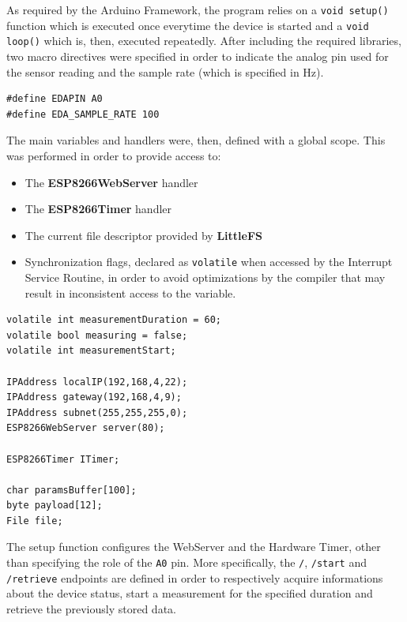 As required by the Arduino Framework, the program relies on a \texttt{void setup()} function which is executed once everytime the device is started and a \texttt{void loop()} which is, then, executed repeatedly. After including the required libraries, two macro directives were specified in order to indicate the analog pin used for the sensor reading and the sample rate (which is specified in Hz).

\begin{verbatim}
#define EDAPIN A0
#define EDA_SAMPLE_RATE 100
\end{verbatim}

The main variables and handlers were, then, defined with a global scope. This was performed in order to provide access to:

\begin{itemize}
    \item The \textbf{ESP8266WebServer} handler
    \item The \textbf{ESP8266Timer} handler
    \item The current file descriptor provided by \textbf{LittleFS}
    \item Synchronization flags, declared as \texttt{volatile} when accessed by the Interrupt Service Routine, in order to avoid optimizations by the compiler that may result in inconsistent access to the variable.
\end{itemize}

\begin{verbatim}
volatile int measurementDuration = 60;
volatile bool measuring = false;
volatile int measurementStart;

IPAddress localIP(192,168,4,22);
IPAddress gateway(192,168,4,9);
IPAddress subnet(255,255,255,0);
ESP8266WebServer server(80);

ESP8266Timer ITimer;

char paramsBuffer[100];
byte payload[12];
File file;
\end{verbatim}

The setup function configures the WebServer and the Hardware Timer, other than specifying the role of the \texttt{A0} pin. More specifically, the \texttt{/}, \texttt{/start} and \texttt{/retrieve} endpoints are defined in order to respectively acquire informations about the device status, start a measurement for the specified duration and retrieve the previously stored data.

